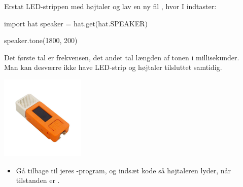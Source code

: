 \documentclass{ucph-handout}
\begin{document}
\begin{exercisebox}[adjusted title=Brug af højtaler]
\begin{minipage}{0.60\linewidth}
Erstat LED-strippen med højtaler og lav en ny fil
, hvor I indtaster:
\begin{python}
import hat
speaker = hat.get(hat.SPEAKER)

speaker.tone(1800, 200)
\end{python}

Det første tal er frekvensen, det andet tal længden af tonen i millisekunder.\\

Man kan desværre ikke have LED-strip og højtaler tilsluttet samtidig.
\end{minipage}
\begin{minipage}{0.30\linewidth}
      \quad\includegraphics[width=4cm]{illustrationer/m5stickc_speaker}
\end{minipage}
    


\begin{itemize}
\item Gå tilbage til jeres -program, og indsæt kode
  så højtaleren lyder, når tilstanden er .
\end{itemize}
\end{exercisebox}



\newpage
\end{document}
